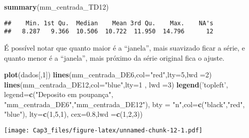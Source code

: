 \documentclass[]{article}
\newenvironment{Shaded}{\begin{snugshade}}{\end{snugshade}}
\newcommand{\DataTypeTok}[1]{\textcolor[rgb]{0.13,0.29,0.53}{#1}}
\newcommand{\DecValTok}[1]{\textcolor[rgb]{0.00,0.00,0.81}{#1}}
\newcommand{\FloatTok}[1]{\textcolor[rgb]{0.00,0.00,0.81}{#1}}
\newcommand{\KeywordTok}[1]{\textcolor[rgb]{0.13,0.29,0.53}{\textbf{#1}}}
\newcommand{\NormalTok}[1]{#1}
\newcommand{\StringTok}[1]{\textcolor[rgb]{0.31,0.60,0.02}{#1}}
\begin{document}
\begin{Shaded}
\begin{Highlighting}[]
\KeywordTok{summary}\NormalTok{(mm_centrada_TD12)}
\end{Highlighting}
\end{Shaded}

\begin{verbatim}
##    Min. 1st Qu.  Median    Mean 3rd Qu.    Max.    NA's 
##   8.287   9.366  10.506  10.722  11.950  14.796      12
\end{verbatim}

É possível notar que quanto maior é a ``janela'', mais suavizado ficar a
série, e quanto menor é a ``janela'', mais próximo da série original
fica o ajuste.

\begin{Shaded}
\begin{Highlighting}[]
\KeywordTok{plot}\NormalTok{(dados[,}\DecValTok{1}\NormalTok{])}
\KeywordTok{lines}\NormalTok{(mm_centrada_DE6,}\DataTypeTok{col=}\StringTok{"red"}\NormalTok{,}\DataTypeTok{lty=}\DecValTok{5}\NormalTok{,}\DataTypeTok{lwd =}\DecValTok{2}\NormalTok{)}
\KeywordTok{lines}\NormalTok{(mm_centrada_DE12,}\DataTypeTok{col=}\StringTok{"blue"}\NormalTok{,}\DataTypeTok{lty=}\DecValTok{1}\NormalTok{ , }\DataTypeTok{lwd =}\DecValTok{3}\NormalTok{)}
\KeywordTok{legend}\NormalTok{(}\StringTok{'topleft'}\NormalTok{, }\DataTypeTok{legend=}\KeywordTok{c}\NormalTok{(}\StringTok{"Deposito em poupança"}\NormalTok{, }\StringTok{"mm_centrada_DE6"}\NormalTok{,}\StringTok{"mm_centrada_DE12"}\NormalTok{),}
\DataTypeTok{bty =} \StringTok{"n"}\NormalTok{,}\DataTypeTok{col=}\KeywordTok{c}\NormalTok{(}\StringTok{"black"}\NormalTok{,}\StringTok{"red"}\NormalTok{, }\StringTok{"blue"}\NormalTok{), }\DataTypeTok{lty=}\KeywordTok{c}\NormalTok{(}\DecValTok{1}\NormalTok{,}\DecValTok{5}\NormalTok{,}\DecValTok{1}\NormalTok{), }\DataTypeTok{cex=}\FloatTok{0.8}\NormalTok{,}\DataTypeTok{lwd =}\KeywordTok{c}\NormalTok{(}\DecValTok{1}\NormalTok{,}\DecValTok{2}\NormalTok{,}\DecValTok{3}\NormalTok{))}
\end{Highlighting}
\end{Shaded}

\texttt{[image: Cap3\_files/figure-latex/unnamed-chunk-12-1.pdf]}
\end{document}
